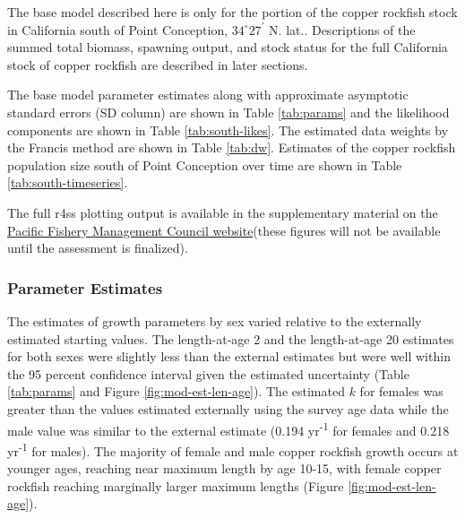 \documentclass[11pt,
  english,
  letterpaper,
]{article}
\begin{document}
The base model described here is only for the portion of the copper rockfish stock in California south of Point Conception, $34^\circ 27^\prime$ N. lat.. Descriptions of the summed total biomass, spawning output, and stock status for the full California stock of copper rockfish are described in later sections.

The base model parameter estimates along with approximate asymptotic standard errors (SD column) are shown in Table \ref{tab:params} and the likelihood components are shown in Table \ref{tab:south-likes}. The estimated data weights by the Francis method are shown in Table \ref{tab:dw}. Estimates of the copper rockfish population size south of Point Conception over time are shown in Table \ref{tab:south-timeseries}.

The full r4ss plotting output is available in the supplementary material on the \href{pcouncil.org}{Pacific Fishery Management Council website}(these figures will not be available until the assessment is finalized).

\hypertarget{parameter-estimates}{%
\subsubsection{Parameter Estimates}\label{parameter-estimates}}

The estimates of growth parameters by sex varied relative to the externally estimated starting values. The length-at-age 2 and the length-at-age 20 estimates for both sexes were slightly less than the external estimates but were well within the 95 percent confidence interval given the estimated uncertainty (Table \ref{tab:params} and Figure \ref{fig:mod-est-len-age}). The estimated \(k\) for females was greater than the values estimated externally using the survey age data while the male value was similar to the external estimate (0.194 yr\textsuperscript{-1} for females and 0.218 yr\textsuperscript{-1} for males). The majority of female and male copper rockfish growth occurs at younger ages, reaching near maximum length by age 10-15, with female copper rockfish reaching marginally larger maximum lengths (Figure \ref{fig:mod-est-len-age}).
\end{document}
